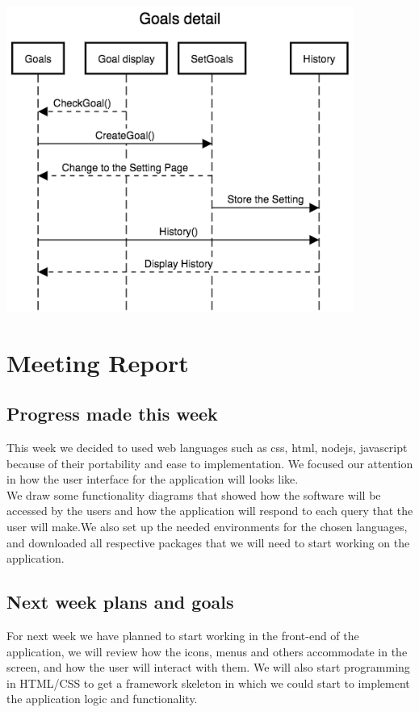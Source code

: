 \documentclass[a4paper]{article}
\begin{document}
\includegraphics[width=\textwidth,height=10cm]{Goals_detail.png}
\newline
\section{Meeting Report}

\subsection{Progress made this week}

This week we decided to used web languages such as css, html, nodejs, javascript because of their portability and ease to implementation. We focused our attention in how the user interface for the application will looks like.\\

\noindent We draw some functionality diagrams that showed how the software will be accessed by the users and how the application will respond  to each query that the user will make.We also set up the needed environments for the chosen languages, and downloaded all respective packages that we will need to start working on the application.

\subsection{Next week plans and goals}
For next week we have planned to start working in the front-end of the application, we will review how the icons, menus and others accommodate in the screen, and how the user will interact with them. We will also start programming in HTML/CSS to get a framework skeleton in which we could start to implement the application logic and functionality.\\ 
\end{document}
